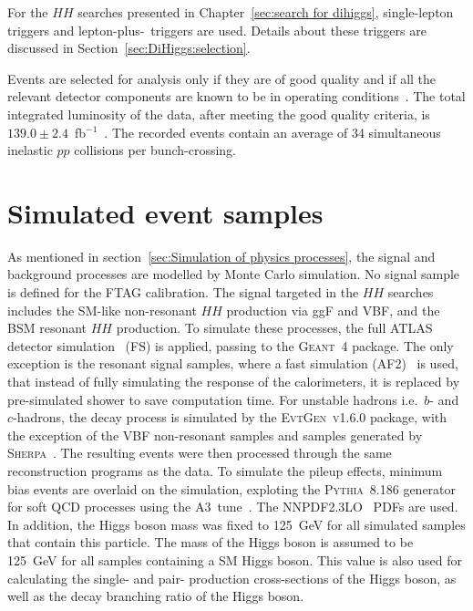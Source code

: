 For the $HH$ searches presented in Chapter~\ref{sec:search for dihiggs},
single-lepton triggers and lepton-plus-\tauhad\ triggers are used. 
Details about these triggers are discussed in Section~\ref{sec:DiHiggs:selection}.

Events are selected for analysis only if they are of good quality and
if all the relevant detector components are known to be in operating conditions~\cite{DAPR-2018-01}.
The total integrated luminosity of the data, after meeting the good quality criteria,
is $139.0 \pm 2.4$~fb$^{-1}$~\cite{ATLAS-CONF-2019-021,ATLAS-Lumi2}.
The recorded events contain an average of 34 simultaneous inelastic $pp$ collisions per bunch-crossing.


\section{Simulated event samples}
\label{sec:DiHiggs:simulation}
As mentioned in section~\ref{sec:Simulation of physics processes},
the signal and background processes are modelled by Monte Carlo simulation. 
No signal sample is defined for the FTAG calibration. 
The signal targeted in the 
$HH$ searches
includes the SM-like non-resonant $HH$ production 
via ggF and VBF, 
and the BSM resonant $HH$ production. 
To simulate these processes, the full 
ATLAS detector simulation~\cite{SOFT-2010-01} (FS)
is applied, passing to the \textsc{Geant~4} package. 
The only exception is the resonant signal samples, 
where a fast simulation (AF2)~\cite{SOFT-2010-01} is used, 
that instead of fully simulating the response of the calorimeters,
it is replaced by pre-simulated shower to save computation time. 
For unstable hadrons i.e.\ 
$b$- and $c$-hadrons, the decay process is simulated 
by the \textsc{EvtGen~v1.6.0} package\cite{Lange:2001uf},
with the exception of the VBF non-resonant samples 
and samples generated by \textsc{Sherpa}~\cite{Bothmann:2019yzt}.
The resulting events were then
processed through the same reconstruction programs as the data.
To simulate the pileup effects, 
minimum bias events are overlaid on the simulation, 
exploting the \textsc{Pythia~8.186} generator~\cite{Sjostrand:2007gs}
for soft QCD processes using the A3~tune~\cite{ATL-PHYS-PUB-2016-017}.
The \textsc{NNPDF2.3LO}~\cite{Ball:2012cx} PDFs are used.
In addition, the Higgs boson mass was fixed to 125~GeV 
for all simulated samples that contain this particle.
The mass of the Higgs boson is assumed to be 125~GeV 
for all samples containing a SM Higgs boson.
This value is also used for calculating the 
single- and pair- production cross-sections 
of the Higgs boson, as well as the decay branching ratio of
the Higgs boson. 

